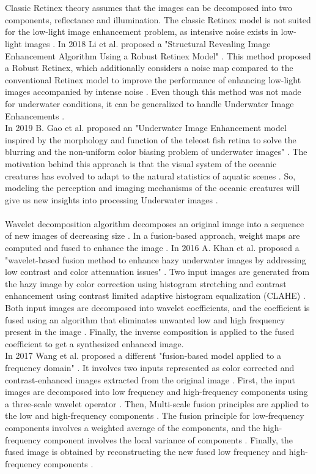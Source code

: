 \documentclass[a4paper,11pt,oneside]{article}
\begin{document}
\\
  \\
    Classic Retinex theory assumes that the images can be decomposed into two components, reflectance and illumination. The classic Retinex model is not suited for the low-light image enhancement problem, as intensive noise exists in low-light images \cite{5}. In 2018 Li et al. \cite{5} proposed a "Structural Revealing Image Enhancement Algorithm Using a Robust Retinex Model" \cite{5}. This method proposed a Robust Retinex, which additionally considers a noise map compared to the conventional Retinex model to improve the performance of enhancing low-light images accompanied by intense noise \cite{5}. Even though this method was not made for underwater conditions, it can be generalized to handle Underwater Image Enhancements \cite{5}.\\
  In 2019 B. Gao et al. \cite{6} proposed an "Underwater Image Enhancement model inspired by the morphology and function of the teleost fish retina to solve the blurring and the non-uniform color biasing problem of underwater images" \cite{6}. The motivation behind this approach is that the visual system of the oceanic creatures has evolved to adapt to the natural statistics of aquatic scenes \cite{6}. So, modeling the perception and imaging mechanisms of the oceanic creatures will give us new insights into processing Underwater images \cite{6}.\\
  \\
   Wavelet decomposition algorithm decomposes an original image into a sequence of new images of decreasing size \cite{24}. In a fusion-based approach, weight maps are computed and fused to enhance the image \cite{10}.  In 2016 A. Khan et al. \cite{9} proposed a "wavelet-based fusion method to enhance hazy underwater images by addressing low contrast and color attenuation issues" \cite{9}. Two input images are generated from the hazy image by color correction using histogram stretching and contrast enhancement using contrast limited adaptive histogram equalization (CLAHE) \cite{9}. Both input images are decomposed into wavelet coefficients, and the coefficient is fused using an algorithm that eliminates unwanted low and high frequency present in the image \cite{9}. Finally, the inverse composition is applied to the fused coefficient to get a synthesized enhanced image. \cite{9}\\
  In 2017 Wang et al. \cite{12} proposed a different "fusion-based model applied to a frequency domain" \cite{12}. It involves two inputs represented as color corrected and contrast-enhanced images extracted from the original image \cite{12}. First, the input images are decomposed into low frequency and high-frequency components using a three-scale wavelet operator \cite{12}. Then, Multi-scale fusion principles are applied to the low and high-frequency components \cite{12}. The fusion principle for low-frequency components involves a weighted average of the components, and the high-frequency component involves the local variance of components \cite{12}. Finally, the fused image is obtained by reconstructing the new fused low frequency and high-frequency components \cite{12}.\\
\end{document}
